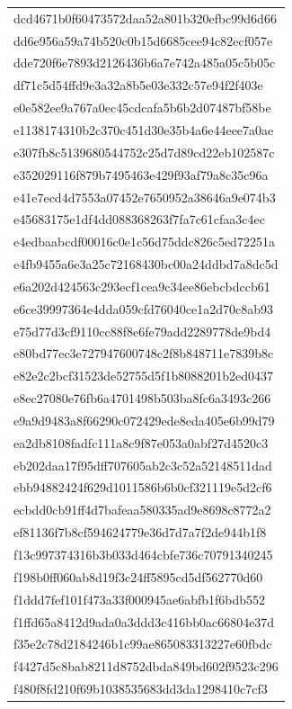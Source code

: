 \begin{tabular}{l}
dcd4671b0f60473572daa52a801b320efbc99d6d66 \\
dd6e956a59a74b520c0b15d6685cee94c82ecf057e \\
dde720f6e7893d2126436b6a7e742a485a05c5b05c \\
df71c5d54ffd9e3a32a8b5e03e332c57e94f2f403e \\
e0e582ee9a767a0ec45cdcafa5b6b2d07487bf58be \\
e1138174310b2c370c451d30e35b4a6e44eee7a0ae \\
e307fb8c5139680544752c25d7d89cd22eb102587c \\
e352029116f879b7495463e429f93af79a8c35c96a \\
e41e7ecd4d7553a07452e7650952a38646a9e074b3 \\
e45683175e1df4dd088368263f7fa7c61cfaa3c4ec \\
e4edbaabcdf00016c0e1c56d75ddc826c5ed72251a \\
e4fb9455a6e3a25c72168430bc00a24ddbd7a8dc5d \\
e6a202d424563c293ecf1cea9c34ee86ebcbdccb61 \\
e6ce39997364e4dda059cfd76040ce1a2d70c8ab93 \\
e75d77d3cf9110cc88f8e6fe79add2289778de9bd4 \\
e80bd77ec3e727947600748c2f8b848711e7839b8c \\
e82e2c2bcf31523de52755d5f1b8088201b2ed0437 \\
e8ec27080e76fb6a4701498b503ba8fc6a3493c266 \\
e9a9d9483a8f66290c072429ede8eda405e6b99d79 \\
ea2db8108fadfc111a8c9f87e053a0abf27d4520c3 \\
eb202daa17f95dff707605ab2c3c52a52148511dad \\
ebb94882424f629d1011586b6b0cf321119e5d2cf6 \\
ecbdd0cb91ff4d7bafeaa580335ad9e8698c8772a2 \\
ef81136f7b8cf594624779e36d7d7a7f2de944b1f8 \\
f13c997374316b3b033d464cbfe736c70791340245 \\
f198b0ff060ab8d19f3c24ff5895cd5df562770d60 \\
f1ddd7fef101f473a33f000945ae6abfb1f6bdb552 \\
f1ffd65a8412d9ada0a3ddd3c416bb0ac66804e37d \\
f35e2c78d2184246b1c99ae865083313227e60fbdc \\
f4427d5c8bab8211d8752dbda849bd602f9523c296 \\
f480f8fd210f69b1038535683dd3da1298410c7cf3 \\

\end{tabular}
